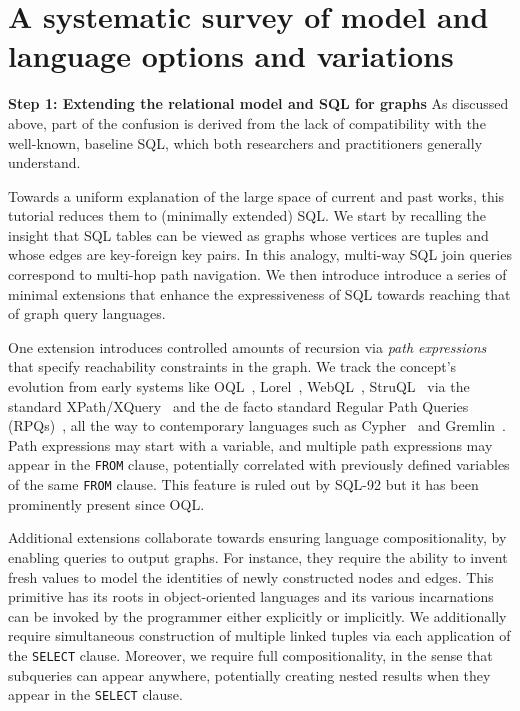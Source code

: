 \section{A systematic survey of model and language options and variations}

\noindent \textbf{Step 1: Extending the relational model and SQL for graphs} As discussed above, part of the confusion is derived from the lack of compatibility with the well-known, baseline SQL, which both researchers and practitioners generally understand.

Towards a uniform explanation of the large space of current and past works, this tutorial reduces them to (minimally extended) SQL.
We start by recalling the insight that SQL tables can be viewed as graphs whose
vertices are tuples and whose edges are key-foreign key pairs. In this analogy, multi-way SQL join queries correspond to multi-hop path navigation.
We then introduce introduce a series of minimal extensions that enhance the expressiveness of SQL towards reaching that of graph query languages.

One extension introduces controlled amounts of recursion via {\em path expressions} that specify reachability constraints in the graph.
We track the concept's evolution from early systems like OQL~\cite{oql},
Lorel~\cite{lorel}, WebQL~\cite{webql}, StruQL~\cite{struql} via the standard XPath/XQuery~\cite{XQuery}
and the de facto standard Regular Path Queries (RPQs)~\cite{crpqs}, all the way to
contemporary languages such as Cypher~\cite{cypher} and Gremlin~\cite{gremlin}.
Path expressions may start with a variable, and multiple path expressions may appear in the \texttt{FROM} clause, potentially
correlated with previously defined variables of the same \texttt{FROM} clause. This feature is ruled out by SQL-92 but it has been prominently present
since OQL.

Additional extensions collaborate towards ensuring language compositionality, by enabling queries to output graphs.
For instance, they require the ability to invent fresh values to model the identities of newly constructed nodes and edges. This primitive has
its roots in object-oriented languages and its various incarnations can be invoked by the programmer either explicitly or implicitly.
We additionally require simultaneous construction of multiple linked tuples via each application of the \texttt{SELECT} clause.
Moreover, we require full compositionality, in the sense that subqueries can appear anywhere, potentially creating nested results when they appear in the \texttt{SELECT} clause.

